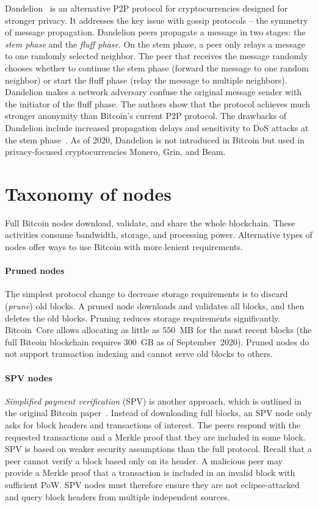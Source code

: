 Dandelion~\cite{Venkatakrishnan2017, Fanti2018} is an alternative P2P protocol for cryptocurrencies designed for stronger privacy.
It addresses the key issue with gossip protocols -- the symmetry of message propagation.
Dandelion peers propagate a message in two stages: the \textit{stem phase} and the \textit{fluff phase}.
On the stem phase, a peer only relays a message to one randomly selected neighbor.
The peer that receives the message randomly chooses whether to continue the stem phase (forward the message to one random neighbor) or start the fluff phase (relay the message to multiple neighbors).
Dandelion makes a network adversary confuse the original message sender with the initiator of the fluff phase.
The authors show that the protocol achieves much stronger anonymity than Bitcoin's current P2P protocol.
The drawbacks of Dandelion include increased propagation delays and sensitivity to DoS attacks at the stem phase~\cite{Stewart2018}.
As of 2020, Dandelion is not introduced in Bitcoin but used in privacy-focused cryptocurrencies Monero, Grin, and Beam.


\section{Taxonomy of nodes}
\label{sec:TaxonomyOfNodes}

Full Bitcoin nodes download, validate, and share the whole blockchain.
These activities consume bandwidth, storage, and processing power.
Alternative types of nodes offer ways to use Bitcoin with more lenient requirements.

\paragraph{Pruned nodes}
The simplest protocol change to decrease storage requirements is to discard (\textit{prune}) old blocks.
A pruned node downloads and validates all blocks, and then deletes the old blocks.
Pruning reduces storage requirements significantly.
Bitcoin~Core allows allocating as little as $550$~MB for the most recent blocks (the full Bitcoin blockchain requires $300$~GB as of September~2020).
Pruned nodes do not support transaction indexing and cannot serve old blocks to others.

\paragraph{SPV nodes}
\textit{Simplified payment verification} (SPV) is another approach, which is outlined in the original Bitcoin paper~\cite{Nakamoto2008}.
Instead of downloading full blocks, an SPV node only asks for block headers and transactions of interest.
The peers respond with the requested transactions and a Merkle proof that they are included in some block.
SPV is based on weaker security assumptions than the full protocol.
Recall that a peer cannot verify a block based only on its header.
A malicious peer may provide a Merkle proof that a transaction is included in an invalid block with sufficient PoW.
SPV nodes must therefore ensure they are not eclipse-attacked and query block headers from multiple independent sources.

